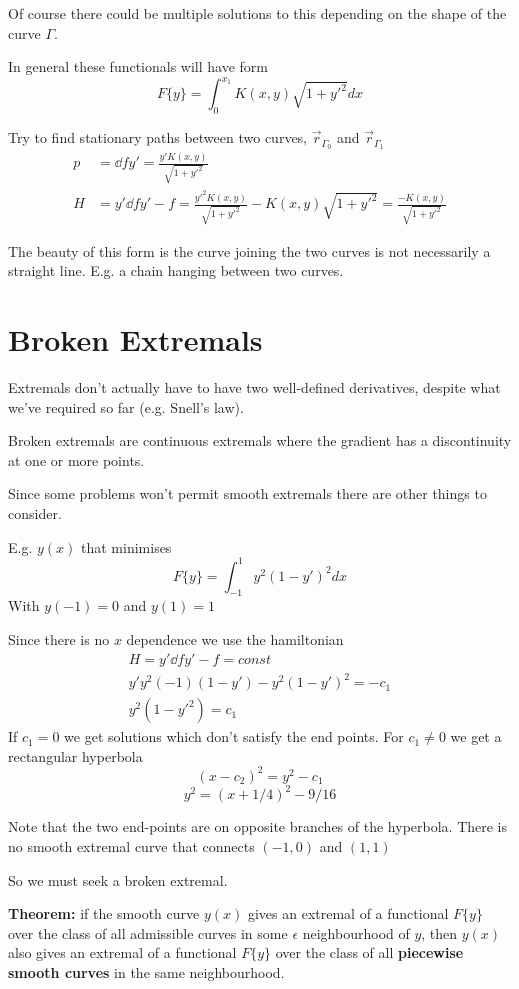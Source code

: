 \documentclass{E:/Documents/Latex/myassignment}
\begin{document}
Of course there could be multiple solutions to this depending on the shape of the curve $\Gamma$.


In general these functionals will have form
\[F\{y\} = \int_0^{x_1} K(x,y) \sqrt{1+y'^2} dx\]

Try to find stationary paths between two curves, $\vec r_{\Gamma_0}$ and $\vec r_{\Gamma_1}$
\begin{align*}
	p &= \dd f{y'} = \frac{y' K(x,y)}{\sqrt{1+y'^2}}\\
	H &= y' \dd f{y'} - f = \frac{y'^2 K(x,y)}{\sqrt{1+y'^2}} - K(x,y) \sqrt{1+y'^2} = \frac{-K(x,y)}{\sqrt{1+y'^2}}
\end{align*}

The beauty of this form is the curve joining the two curves is not necessarily a straight line. 
E.g. a chain hanging between two curves.


\section{Broken Extremals}

Extremals don't actually have to have two well-defined derivatives, despite what we've required so far (e.g. Snell's law).

Broken extremals are continuous extremals where the gradient has a discontinuity at one or more points.

Since some problems won't permit smooth extremals there are other things to consider.

E.g. $y(x)$ that minimises 
\[F\{y\} = \int_{-1}^{1} y^2 (1-y')^2 dx\]
With $y(-1) = 0$ and $y(1) = 1$

Since there is no $x$ dependence we use the hamiltonian
\begin{align*}
	H = y' \dd f{y'} - f = const\\
	y'y^2(-1)(1-y') - y^2(1-y')^2 = -c_1\\
	y^2(1-y'^2) = c_1
\end{align*}
If $c_1 = 0$ we get solutions which don't satisfy the end points.
For $c_1 \neq 0$ we get a rectangular hyperbola
\[(x-c_2)^2 = y^2 - c_1\]
\[y^2 = (x+1/4)^2 - 9/16\]

Note that the two end-points are on opposite branches of the hyperbola. There is no smooth extremal curve that connects $(-1,0)$ and $(1,1)$

So we must seek a broken extremal. 



\textbf{Theorem:} if the smooth curve $y(x)$ gives an extremal of a functional $F\{y\}$ over the class of all admissible curves in some $\epsilon$ neighbourhood of $y$, then $y(x)$ also gives an extremal of a functional $F\{y\}$ over the class of all \textbf{piecewise smooth curves} in the same neighbourhood.
\end{document}
